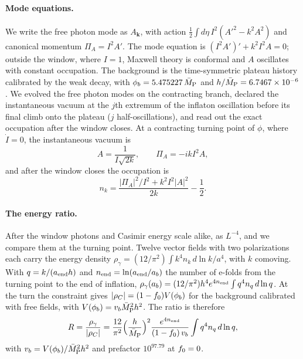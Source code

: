 \paragraph{Mode equations.}
We write the free photon mode as $A_{\bm k}$, with action $\tfrac12\int d\eta\,I^2(A'^2-k^2A^2)$ and canonical momentum $\Pi_A=I^2A'$.
The mode equation is $(I^2A')'+k^2I^2A=0$; outside the window, where $I=1$, Maxwell theory is conformal and $A$ oscillates with constant occupation.
The background is the time-symmetric plateau history calibrated by the weak decay, with $\phi_b=5.475227\,\bar M_{\mathrm{P}}$ and $h/\bar M_{\mathrm{P}}=6.7467\times10^{-6}$. %
We evolved the free photon modes on the contracting branch, declared the instantaneous vacuum at the $j$th extremum of the inflaton oscillation before its final climb onto the plateau ($j$ half-oscillations), and read out the exact occupation after the window closes.
At a contracting turning point of $\phi$, where $\dot I=0$, the instantaneous vacuum is
\begin{equation}
A=\frac{1}{I\sqrt{2k}},\qquad \Pi_A=-ikI^2A,
\end{equation}
and after the window closes the occupation is
\begin{equation}
n_k=\frac{|\Pi_A|^2/I^2+k^2I^2|A|^2}{2k}-\frac12 .
\end{equation}

\paragraph{The energy ratio.}
After the window photons and Casimir energy scale alike, as $L^{-4}$, and we compare them at the turning point.
Twelve vector fields with two polarizations each carry the energy density $\rho_\gamma=(12/\pi^2)\int k^4n_k\,d\ln k/a^4$, with $k$ comoving.
With $q=k/(a_{\rm end}h)$ and $n_{\rm end}=\ln(a_{\rm end}/a_b)$ the number of e-folds from the turning point to the end of inflation, $\rho_\gamma(a_b)=(12/\pi^2)h^4e^{4n_{\rm end}}\int q^4n_q\,d\ln q$.
At the turn the constraint gives $|\rho_C|=(1-f_0)V(\phi_b)$ for the background calibrated with free fields, with $V(\phi_b)=v_b\bar M_{\mathrm{P}}^2h^2$.
The ratio is therefore
\begin{equation}
R=\frac{\rho_\gamma}{|\rho_C|}=\frac{12}{\pi^2}\Big(\frac h{\bar M_{\mathrm{P}}}\Big)^2\frac{e^{4n_{\rm end}}}{(1-f_0)\,v_b}\int q^4n_q\,d\ln q,
\label{eq:rA-Rformula}
\end{equation}
with $v_b=V(\phi_b)/\bar M_{\mathrm{P}}^2h^2$ and prefactor $10^{97.79}$ at $f_0=0$. %

